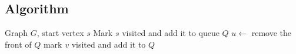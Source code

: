 \subsection{Algorithm}
\begin{algorithm}[H]
\caption{Breadth-first search}\label{alg:bfs}
\begin{algorithmic}[1]
\Require Graph $G$, start vertex $s$
\State Mark $s$ visited and add it to queue $Q$
  \State $u \gets$ remove the front of $Q$
     \State mark $v$ visited and add it to $Q$ \EndIf
  \EndFor
\EndWhile
\end{algorithmic}
\end{algorithm}
